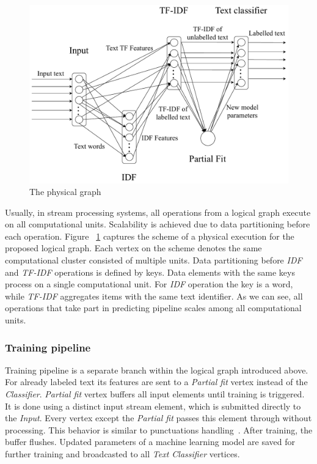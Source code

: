 \begin{figure}[htbp]
  \centering
  \includegraphics[scale=0.375]{pics/physical-graph}
  \caption{The physical graph}
  \label {physical_graph}
\end{figure}

Usually, in stream processing systems, all operations from a logical graph execute on all computational units. Scalability is achieved due to data partitioning before each operation. Figure ~\ref{physical_graph} captures the scheme of a physical execution for the proposed logical graph. Each vertex on the scheme denotes the same computational cluster consisted of multiple units. Data partitioning before {\em IDF} and {\em TF-IDF} operations is defined by keys. Data elements with the same keys process on a single computational unit. For {\em IDF} operation the key is a word, while {\em TF-IDF} aggregates items with the same text identifier. As we can see, all operations that take part in predicting pipeline scales among all computational units. 

\subsubsection{Training pipeline}

Training pipeline is a separate branch within the logical graph introduced above. For already labeled text its features are sent to a {\em Partial fit} vertex instead of the {\em Classifier}. {\em Partial fit} vertex buffers all input elements until training is triggered. It is done using a distinct input stream element, which is submitted directly to the {\em Input}. Every vertex except the {\em Partial fit} passes this element through without processing. This behavior is similar to punctuations handling~\cite{tucker2003exploiting}. After training, the buffer flushes. Updated parameters of a machine learning model are saved for further training and broadcasted to all {\em Text Classifier} vertices.

